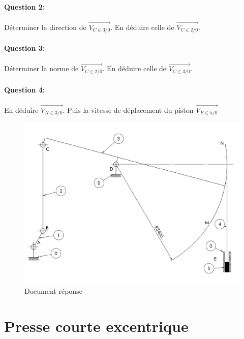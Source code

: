 \paragraph{Question 2:} Déterminer la direction de $\overrightarrow{V_{C \in 3/0}}$. En déduire celle de $\overrightarrow{V_{C \in 2/0}}$.

\paragraph{Question 3:} Déterminer la norme de $\overrightarrow{V_{C \in 2/0}}$. En déduire celle de $\overrightarrow{V_{C \in 3/0}}$.

\paragraph{Question 4:} En déduire $\overrightarrow{V_{N \in 3/0}}$. Puis la vitesse de déplacement du piston $\overrightarrow{V_{E \in 5/0}}$

\newpage

\begin{figure}[!h]
\begin{center}
\vspace{5cm}
\includegraphics[width=0.8\linewidth]{img/pompe2.png}
\vspace{5cm}
\caption{Document réponse}
\label{fig:image2}
\end{center}
\end{figure}

\newpage

\section{Presse courte excentrique}

